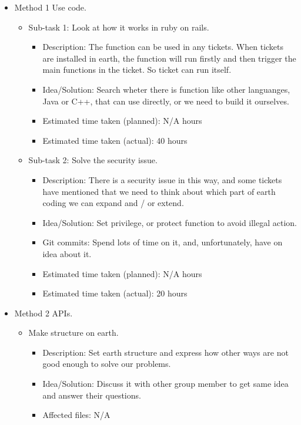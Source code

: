 \documentclass{article}
\begin{document}
\begin{itemize}
	\item Method 1 Use code.
	     \begin{itemize}
	        \item Sub-task 1: Look at how it works in ruby on rails.
	           \begin{itemize}
					\item Description: The function can be used in any tickets. When tickets are installed in earth, the function will run firstly and then trigger the main functions in the ticket. So ticket can run itself.
					\item Idea/Solution: Search wheter there is function like other languanges, Java or C++, that can use directly, or we need to build it ourselves. 
					\item Estimated time taken (planned): N/A hours
					\item Estimated time taken (actual): 40 hours
				\end{itemize}
			\item Sub-task 2: Solve the security issue.
			   \begin{itemize}
					\item Description: There is a security issue in this way, and some tickets have mentioned that we need to think about which part of earth coding we can expand and / or extend. 
					\item Idea/Solution: Set privilege, or protect function to avoid illegal action.
					\item Git commits: Spend lots of time on it, and, unfortunately, have on idea about it.
					\item Estimated time taken (planned): N/A hours
					\item Estimated time taken (actual): 20 hours
				\end{itemize}
	     \end{itemize}
	\item Method 2 APIs.
	     \begin{itemize}
	         \item Make structure on earth.
	            \begin{itemize}
	              \item Description: Set earth structure and express how other ways are not good enough to solve our problems. 
					\item Idea/Solution: Discuss it with other group member to get same idea and answer their questions.
					\item Affected files: N/A

\end{itemize}
\end{itemize}
\end{itemize}
\end{document}
